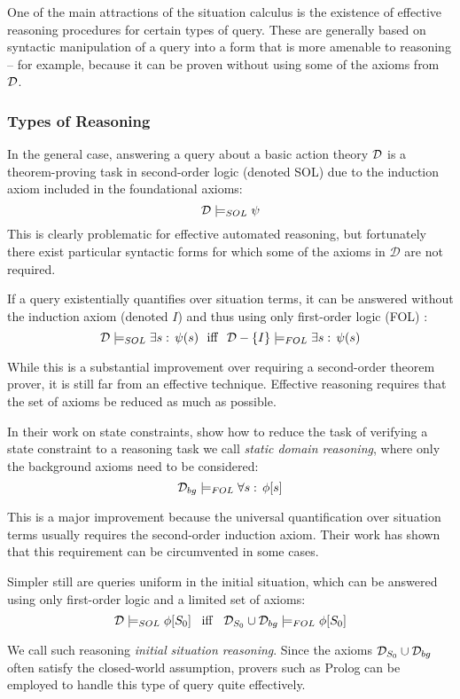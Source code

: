 One of the main attractions of the situation calculus is the existence
of effective reasoning procedures for certain types of query. These
are generally based on syntactic manipulation of a query into a form
that is more amenable to reasoning -- for example, because it can
be proven without using some of the axioms from $\mathcal{D}$.


\subsubsection{Types of Reasoning}

In the general case, answering a query about a basic action theory
$\mathcal{D}$ is a theorem-proving task in second-order logic (denoted SOL)
due to the induction axiom included in the foundational axioms:\[
\mathcal{D}\models_{SOL}\psi\]
 This is clearly problematic for effective automated reasoning, but
fortunately there exist particular syntactic forms for which some
of the axioms in $\mathcal{D}$ are not required.

If a query existentially quantifies over situation terms, it can be
answered without the induction axiom (denoted $I$) and thus using
only first-order logic (FOL) \citep{pirri99contributions_sitcalc}:\[
\mathcal{D}\models_{SOL}\exists s:\,\psi(s)\,\,\,\,\mathrm{iff}\,\,\,\,\mathcal{D}-\{I\}\models_{FOL}\exists s:\,\psi(s)\]


While this is a substantial improvement over requiring a second-order
theorem prover, it is still far from an effective technique. Effective
reasoning requires that the set of axioms be reduced as much as possible.

In their work on state constraints, \citet{Lin94-StateConstraints}
show how to reduce the task of verifying a state constraint to a reasoning
task we call \emph{static domain reasoning}, where only the background
axioms need to be considered:\[
\mathcal{D}_{bg}\models_{FOL}\forall s:\,\phi[s]\]


This is a major improvement because the universal quantification over
situation terms usually requires the second-order induction axiom.
Their work has shown that this requirement can be circumvented in
some cases.

Simpler still are queries uniform in the initial situation, which
can be answered using only first-order logic and a limited set of
axioms:\[
\mathcal{D}\models_{SOL}\phi[S_{0}]\,\,\,\,\,\mathit{\mathrm{iff}}\,\,\,\,\,\mathcal{D}_{S_{0}}\cup\mathcal{D}_{bg}\models_{FOL}\phi[S_{0}]\]


We call such reasoning \emph{initial} \emph{situation reasoning}.
Since the axioms $\mathcal{D}_{S_{0}}\cup\mathcal{D}_{bg}$ often satisfy the closed-world
assumption, provers such as Prolog can be employed to handle this
type of query quite effectively.


